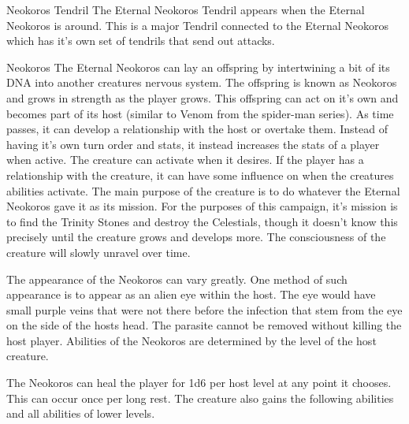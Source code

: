 \begin{monsterbox}{Neokoros Tendril}
	\details[%
	languages = {All},
	challenge = 15
	]
	\dndline%
	The Eternal Neokoros Tendril appears when the Eternal Neokoros is around. This is a major Tendril connected to the Eternal Neokoros which has it's own set of tendrils that send out attacks.
\end{monsterbox}

\begin{commentbox}{Neokoros}
	The Eternal Neokoros can lay an offspring by intertwining a bit of its DNA into another creatures nervous system. The offspring is known as Neokoros and grows in strength as the player grows. This offspring can act on it's own and becomes part of its host (similar to Venom from the spider-man series). As time passes, it can develop a relationship with the host or overtake them. Instead of having it's own turn order and stats, it instead increases the stats of a player when active. The creature can activate when it desires. If the player has a relationship with the creature, it can have some influence on when the creatures abilities activate. The main purpose of the creature is to do whatever the Eternal Neokoros gave it as its mission. For the purposes of this campaign, it's mission is to find the Trinity Stones and destroy the Celestials, though it doesn't know this precisely until the creature grows and develops more. The consciousness of the creature will slowly unravel over time.
	
	The appearance of the Neokoros can vary greatly. One method of such appearance is to appear as an alien eye within the host. The eye would have small purple veins that were not there before the infection that stem from the eye on the side of the hosts head. The parasite cannot be removed without killing the host player. Abilities of the Neokoros are determined by the level of the host creature.
	
	The Neokoros can heal the player for 1d6 per host level at any point it chooses. This can occur once per long rest. The creature also gains the following abilities and all abilities of lower levels.
	

\end{commentbox}
